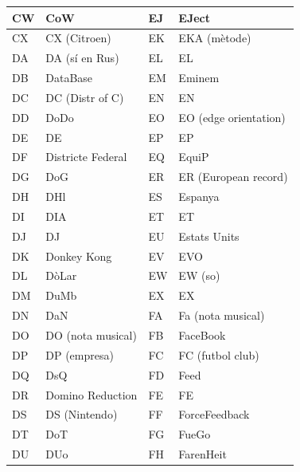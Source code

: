 \begin{table}[ht]
    \centering
    \begin{tabular}{|l|l|l|l|}
        \hline
        CW & CoW               & EJ & EJect                 \\ \hline
        CX & CX (Citroen)      & EK & EKA (mètode)          \\ \hline
        DA & DA (sí en Rus)    & EL & EL                    \\ \hline
        DB & DataBase          & EM & Eminem                \\ \hline
        DC & DC (Distr of C)   & EN & EN                    \\ \hline
        DD & DoDo              & EO & EO (edge orientation) \\ \hline
        DE & DE                & EP & EP                    \\ \hline
        DF & Districte Federal & EQ & EquiP                 \\ \hline
        DG & DoG               & ER & ER (European record)  \\ \hline
        DH & DHl               & ES & Espanya               \\ \hline
        DI & DIA               & ET & ET                    \\ \hline
        DJ & DJ                & EU & Estats Units          \\ \hline
        DK & Donkey Kong       & EV & EVO                   \\ \hline
        DL & DòLar             & EW & EW (so)               \\ \hline
        DM & DuMb              & EX & EX                    \\ \hline
        DN & DaN               & FA & Fa (nota musical)     \\ \hline
        DO & DO (nota musical) & FB & FaceBook              \\ \hline
        DP & DP (empresa)      & FC & FC (futbol club)      \\ \hline
        DQ & DsQ               & FD & Feed                  \\ \hline
        DR & Domino Reduction  & FE & FE                    \\ \hline
        DS & DS (Nintendo)     & FF & ForceFeedback         \\ \hline
        DT & DoT               & FG & FueGo                 \\ \hline
        DU & DUo               & FH & FarenHeit             \\ \hline

\end{tabular}
\end{table}
